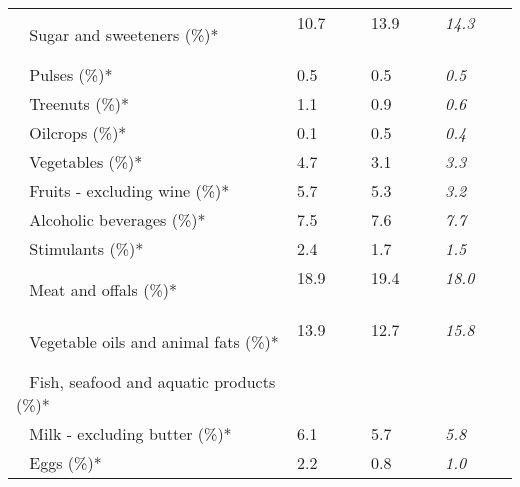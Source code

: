 \begin{tabular}{L{3.9cm} R{1cm} R{1cm} R{1cm}}
	 ~ Sugar and sweeteners (\%)* & 10.7 ~ \ \ & 13.9 ~ \ \ & \textit{14.3} ~ \ \ \\ 
	 ~ Pulses (\%)* & 0.5 ~ \ \ & 0.5 ~ \ \ & \textit{0.5} ~ \ \ \\ 
	 ~ Treenuts (\%)* & 1.1 ~ \ \ & 0.9 ~ \ \ & \textit{0.6} ~ \ \ \\ 
	 ~ Oilcrops (\%)* & 0.1 ~ \ \ & 0.5 ~ \ \ & \textit{0.4} ~ \ \ \\ 
	 ~ Vegetables (\%)* & 4.7 ~ \ \ & 3.1 ~ \ \ & \textit{3.3} ~ \ \ \\ 
	 ~ Fruits - excluding wine (\%)* & 5.7 ~ \ \ & 5.3 ~ \ \ & \textit{3.2} ~ \ \ \\ 
	 ~ Alcoholic beverages (\%)* & 7.5 ~ \ \ & 7.6 ~ \ \ & \textit{7.7} ~ \ \ \\ 
	 ~ Stimulants (\%)* & 2.4 ~ \ \ & 1.7 ~ \ \ & \textit{1.5} ~ \ \ \\ 
	 ~ Meat and offals (\%)* & 18.9 ~ \ \ & 19.4 ~ \ \ & \textit{18.0} ~ \ \ \\ 
	 ~ Vegetable oils and animal fats (\%)* & 13.9 ~ \ \ & 12.7 ~ \ \ & \textit{15.8} ~ \ \ \\ 
	 ~ Fish, seafood and aquatic products (\%)* &  ~ \ \ &  ~ \ \ &  ~ \ \ \\ 
	 ~ Milk - excluding butter (\%)* & 6.1 ~ \ \ & 5.7 ~ \ \ & \textit{5.8} ~ \ \ \\ 
	 ~ Eggs (\%)* & 2.2 ~ \ \ & 0.8 ~ \ \ & \textit{1.0} ~ \ \ \\ 
       \toprule
      \end{tabular}
      \clearpage
{}
